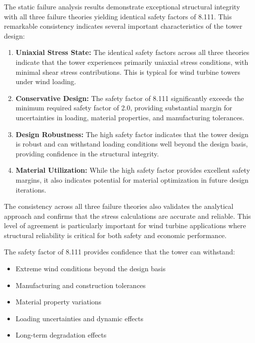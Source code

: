 \documentclass[12pt]{article}
\begin{document}
The static failure analysis results demonstrate exceptional structural integrity with all three failure theories yielding identical safety factors of 8.111. This remarkable consistency indicates several important characteristics of the tower design:

\begin{enumerate}
    \item \textbf{Uniaxial Stress State:} The identical safety factors across all three theories indicate that the tower experiences primarily uniaxial stress conditions, with minimal shear stress contributions. This is typical for wind turbine towers under wind loading.
    
    \item \textbf{Conservative Design:} The safety factor of 8.111 significantly exceeds the minimum required safety factor of 2.0, providing substantial margin for uncertainties in loading, material properties, and manufacturing tolerances.
    
    \item \textbf{Design Robustness:} The high safety factor indicates that the tower design is robust and can withstand loading conditions well beyond the design basis, providing confidence in the structural integrity.
    
    \item \textbf{Material Utilization:} While the high safety factor provides excellent safety margins, it also indicates potential for material optimization in future design iterations.
\end{enumerate}

The consistency across all three failure theories also validates the analytical approach and confirms that the stress calculations are accurate and reliable. This level of agreement is particularly important for wind turbine applications where structural reliability is critical for both safety and economic performance.

The safety factor of 8.111 provides confidence that the tower can withstand:
\begin{itemize}
    \item Extreme wind conditions beyond the design basis
    \item Manufacturing and construction tolerances
    \item Material property variations
    \item Loading uncertainties and dynamic effects
    \item Long-term degradation effects
\end{itemize}
\end{document}
